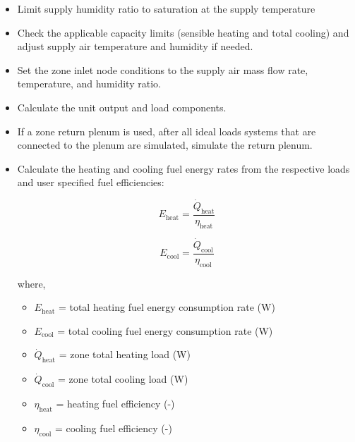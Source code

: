 \begin{itemize}
  \item Limit supply humidity ratio to saturation at the supply temperature
  \item Check the applicable capacity limits (sensible heating and total cooling) and adjust supply air temperature and humidity if needed.
  \item Set the zone inlet node conditions to the supply air mass flow rate, temperature, and humidity ratio.
  \item Calculate the unit output and load components.
  \item If a zone return plenum is used, after all ideal loads systems that are connected to the plenum are simulated, simulate the return plenum.
  \item Calculate the heating and cooling fuel energy rates from the respective loads and user specified fuel efficiencies:

    \begin{equation}
     E_{\text{heat}} = \frac{\dot{Q}_{\text{heat}}}{\eta_{\text{heat}}}
    \end{equation}

    \begin{equation}
     E_{\text{cool}} = \frac{\dot{Q}_{\text{cool}}}{\eta_{\text{cool}}}
    \end{equation}

    where,
 
    \begin{itemize}
      \item \( E_{\text{heat}} \) = total heating fuel energy consumption rate (W)
      \item \( E_{\text{cool}} \) = total cooling fuel energy consumption rate (W)
      \item \( \dot{Q}_{\text{heat}} \) = zone total heating load (W)
      \item \( \dot{Q}_{\text{cool}} \) = zone total cooling load (W)
      \item \( \eta_{\text{heat}} \) = heating fuel efficiency (-)
      \item \( \eta_{\text{cool}} \) = cooling fuel efficiency (-)
    \end{itemize}

  \end{itemize}
